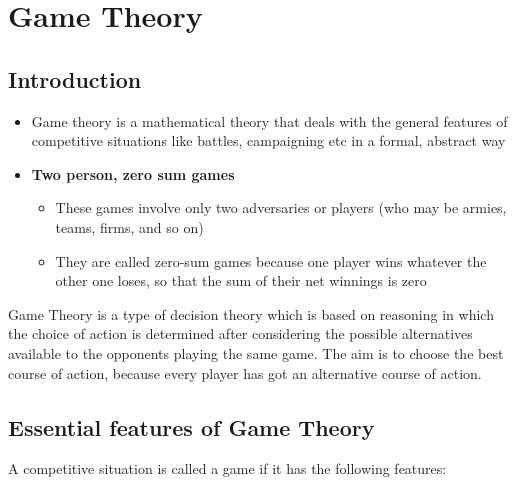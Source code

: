 \documentclass[12pt]{article}
\begin{document}
\section{Game Theory}

\subsection*{Introduction}

\begin{itemize}
\item Game theory is a mathematical theory that deals with the general features of competitive situations like battles, campaigning etc in a formal, abstract way
\item \textbf{Two person, zero sum games}
\begin{itemize}
\item These games involve only two adversaries or players (who may be armies, teams, firms, and so on)
\item They are called zero-sum games because one player wins whatever the other one loses, so that the sum of their net winnings is zero
\end{itemize}
\end{itemize}

Game Theory is a type of decision theory which is based on reasoning in which the choice of
action is determined after considering the possible alternatives available to the opponents playing
the same game. The aim is to choose the best course of action, because every player has got an
alternative course of action.

\subsection*{Essential features of Game Theory}
A competitive situation is called a game if it has the following features:
\end{document}
